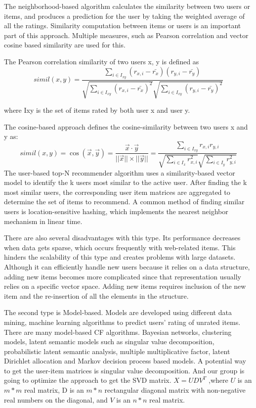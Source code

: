 \documentclass{acmtog} %
\begin{document}
The neighborhood-based algorithm calculates the similarity between two users or items, and produces a prediction for the user by taking the weighted average of all the ratings. Similarity computation between items or users is an important part of this approach. Multiple measures, such as Pearson correlation and vector cosine based similarity are used for this.

The Pearson correlation similarity of two users x, y is defined as
\begin{equation}
simil (x,y)={\frac {\sum \limits _{i\in I_{xy}}(r_{x,i}-{\bar {r_{x}}})(r_{y,i}-{\bar {r_{y}}})}{{\sqrt {\sum \limits _{i\in I_{xy}}(r_{x,i}-{\bar {r_{x}}})^{2}}}{\sqrt {\sum \limits _{i\in I_{xy}}(r_{y,i}-{\bar {r_{y}}})^{2}}}}}
\end{equation}

where Ixy is the set of items rated by both user x and user y.

The cosine-based approach defines the cosine-similarity between two users x and y as\cite{breese1998empirical}:
\begin{equation}
simil (x,y)=\cos({\vec {x}},{\vec {y}})={\frac {{\vec {x}}\cdot {\vec {y}}}{||{\vec {x}}||\times ||{\vec {y}}||}}={\frac {\sum \limits _{i\in I_{xy}}r_{x,i}r_{y,i}}{{\sqrt {\sum \limits _{i\in I_{x}}r_{x,i}^{2}}}{\sqrt {\sum \limits _{i\in I_{y}}r_{y,i}^{2}}}}}
\end{equation}
The user-based top-N recommender algorithm uses a similarity-based vector model to identify the k users most similar to the active user. After finding the k most similar users, the corresponding user item matrices are aggregated to determine the set of items to recommend. A common method of finding similar users is location-sensitive hashing, which implements the nearest neighbor mechanism in linear time.

There are also several disadvantages with this type. Its performance decreases when data gets sparse, which occurs frequently with web-related items. This hinders the scalability of this type and creates problems with large datasets. Although it can efficiently handle new users because it relies on a data structure, adding new items becomes more complicated since that representation usually relies on a specific vector space. Adding new items requires inclusion of the new item and the re-insertion of all the elements in the structure.

The second type is Model-based\cite{Su:2009:SCF:1592474.1722966}. Models are developed using different data mining, machine learning algorithms to predict users' rating of unrated items. There are many model-based CF algorithms. Bayesian networks, clustering models, latent semantic models such as singular value decomposition, probabilistic latent semantic analysis, multiple multiplicative factor, latent Dirichlet allocation and Markov decision process based models\cite{su2009survey}. A potential way to get the user-item matrices is singular value decomposition. And our group is going to optimize the approach to get the SVD matrix\cite{takacs2009scalable}. $X = UDV^T$ ,where $U$ is an $m*m$ real matrix, D is an $m* n$ rectangular diagonal matrix with non-negative real numbers on the diagonal, and $V$ is an $n*n$ real matrix.
\end{document}
